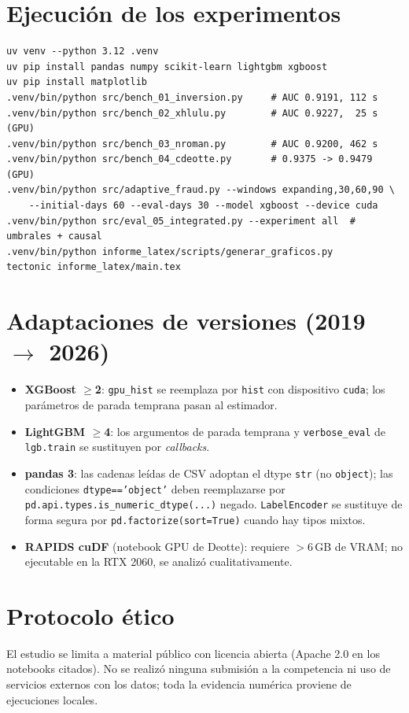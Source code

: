\section{Ejecución de los experimentos}

\begin{verbatim}
uv venv --python 3.12 .venv
uv pip install pandas numpy scikit-learn lightgbm xgboost
uv pip install matplotlib
.venv/bin/python src/bench_01_inversion.py     # AUC 0.9191, 112 s
.venv/bin/python src/bench_02_xhlulu.py        # AUC 0.9227,  25 s (GPU)
.venv/bin/python src/bench_03_nroman.py        # AUC 0.9200, 462 s
.venv/bin/python src/bench_04_cdeotte.py       # 0.9375 -> 0.9479 (GPU)
.venv/bin/python src/adaptive_fraud.py --windows expanding,30,60,90 \
    --initial-days 60 --eval-days 30 --model xgboost --device cuda
.venv/bin/python src/eval_05_integrated.py --experiment all  # umbrales + causal
.venv/bin/python informe_latex/scripts/generar_graficos.py
tectonic informe_latex/main.tex
\end{verbatim}

\section{Adaptaciones de versiones (2019 $\to$ 2026)}

\begin{itemize}
  \item \textbf{XGBoost $\ge$2}: \texttt{gpu\_hist} se reemplaza por \texttt{hist} con
        dispositivo \texttt{cuda}; los parámetros de parada temprana pasan al estimador.
  \item \textbf{LightGBM $\ge$4}: los argumentos de parada temprana y \texttt{verbose\_eval}
        de \texttt{lgb.train} se sustituyen por \emph{callbacks}.
  \item \textbf{pandas 3}: las cadenas leídas de CSV adoptan el dtype \texttt{str} (no
        \texttt{object}); las condiciones \texttt{dtype=='object'} deben reemplazarse por
        \texttt{pd.api.types.is\_numeric\_dtype(...)} negado. \texttt{LabelEncoder} se
        sustituye de forma segura por \texttt{pd.factorize(sort=True)} cuando hay tipos mixtos.
  \item \textbf{RAPIDS cuDF} (notebook GPU de Deotte): requiere $>$6\,GB de VRAM; no ejecutable
        en la RTX 2060, se analizó cualitativamente.
\end{itemize}

\section{Protocolo ético}

El estudio se limita a material público con licencia abierta (Apache 2.0 en los notebooks
citados). No se realizó ninguna submisión a la competencia ni uso de servicios externos con los
datos; toda la evidencia numérica proviene de ejecuciones locales.
